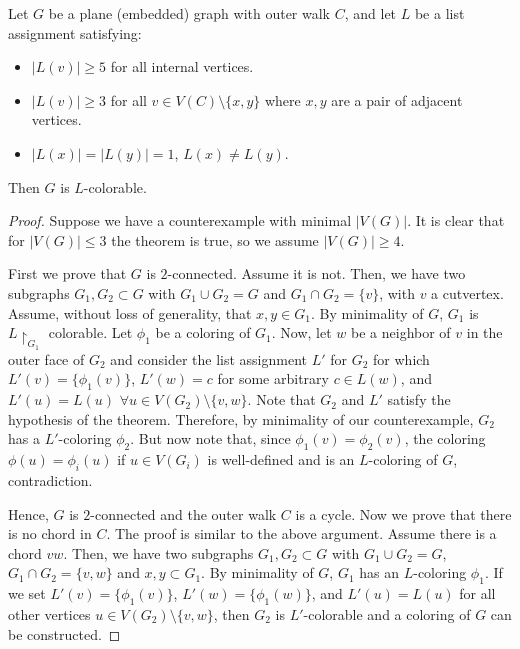 \begin{theorem}
\label{thomassenstrongertheorem}
	Let $G$ be a plane (embedded) graph with outer walk $C$, and let $L$ be a list assignment satisfying:
\begin{itemize}
	\item $|L(v)| \geq 5$ for all internal vertices.
	\item $|L(v)| \geq 3$ for all $v \in V(C) \setminus \{x, y\}$ where $x, y$ are a pair of adjacent vertices.
	\item $|L(x)| = |L(y)| = 1$, $L(x) \neq L(y)$. 
\end{itemize}	
	Then $G$ is $L$-colorable.
\end{theorem}

\begin{proof}
Suppose we have a counterexample with minimal $|V(G)|$. It is clear that for 
$|V(G)| \leq 3$ the theorem is true, so we assume $|V(G)| \geq 4$.

First we prove that $G$ is $2$-connected. Assume it is not. Then, we have two subgraphs $G_1, G_2 \subset G$ with $G_1 \cup G_2 = G$ 
and $G_1 \cap G_2 = \{v\}$, with $v$ a cutvertex. Assume, without loss of generality, that $x, y \in G_1$. By minimality of $G$, 
$G_1$ is $L\restriction_{G_1}$ colorable. Let $\phi_1$ be a coloring of $G_1$. Now, let $w$ be a neighbor of $v$ in the outer face 
of $G_2$ and consider the list assignment $L'$ for $G_2$ for which $L'(v) = \{\phi_1(v)\}$, $L'(w) = c$ for some arbitrary 
$c \in L(w)$, and $L'(u) = L(u)$ $\forall u \in V(G_2) \setminus \{v, w\}$. Note that $G_2$ and $L'$ satisfy the hypothesis 
of the theorem. Therefore, by minimality of our counterexample, $G_2$ has a $L'$-coloring $\phi_2$. But now note that, since 
$\phi_1(v) = \phi_2(v)$, the coloring $\phi(u) = \phi_i(u)$ if $u \in V(G_i)$ is well-defined and is an $L$-coloring of $G$, 
contradiction.

Hence, $G$ is $2$-connected and the outer walk $C$ is a cycle. Now we prove that there is no chord in $C$. The proof is 
similar to the above argument. Assume there is a chord $vw$. Then, we have two subgraphs $G_1, G_2 \subset G$ with 
$G_1 \cup G_2 = G$, $G_1 \cap G_2 = \{v, w\}$ and ${x, y} \subset G_1$. By minimality of $G$, $G_1$ has an $L$-coloring $\phi_1$. 
If we set $L'(v) = \{\phi_1(v)\}$, $L'(w) = \{\phi_1(w)\}$, and $L'(u) = L(u)$ for all other vertices 
$u \in V(G_2) \setminus \{v, w\}$, then $G_2$ is $L'$-colorable and a coloring of $G$ can be constructed.


\end{proof}
